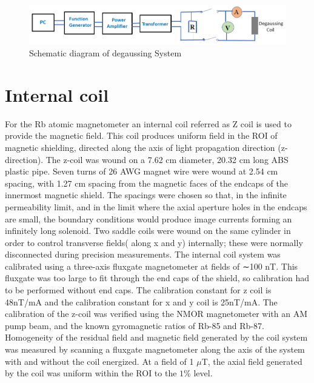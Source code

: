 \begin{figure}[h]
\centering
\includegraphics[width=1.0\linewidth]{figures/degaussing_system}
\caption{Schematic diagram of degaussing System}
\end{figure}

\section{Internal coil\label{sec:Internal coil}}
 For the Rb atomic magnetometer an internal coil referred as Z coil is used to provide the magnetic field. This coil produces uniform field in the ROI  of magnetic shielding, directed along the axis of light propagation direction (z-direction). The z-coil was wound on a 7.62 cm diameter, 20.32 cm long ABS plastic pipe. Seven turns of 26 AWG magnet wire were wound at 2.54 cm spacing, with 1.27 cm spacing from the magnetic faces of the endcaps of the innermost magnetic shield. The spacings were chosen so that, in the infinite permeability limit, and in the limit where the axial aperture holes in the endcaps are small, the boundary conditions would produce image currents forming an infinitely long solenoid. Two saddle coils were wound on the same cylinder in order to control transverse fields( along x and y) internally; these were normally disconnected during precision measurements. The internal coil system was calibrated using a three-axis fluxgate magnetometer at fields of ∼100 nT. This fluxgate was too large to fit through the end caps of the shield, so calibration
had to be performed without end caps. The calibration constant for z coil is 48nT/mA and the calibration constant for x and y coil is 25nT/mA. The calibration of the z-coil was verified using the NMOR magnetometer with an AM pump beam, and the known gyromagnetic ratios of Rb-85 and Rb-87. Homogeneity of the residual field and magnetic field generated by the coil system was measured by scanning a fluxgate magnetometer along the axis of the system with and without the coil energized. At a field of 1 $\mu$T, the axial field generated by the coil was uniform within the ROI to the $1\%$  level.

